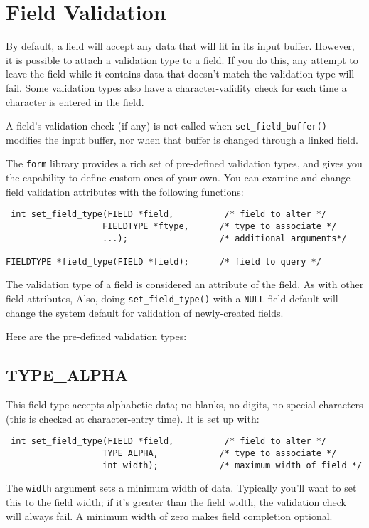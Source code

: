 \section{Field Validation}

\label{f0:fvalidation}By default, a field will accept any data that will fit in its input buffer.
However, it is possible to attach a validation type to a field.  If you do
this, any attempt to leave the field while it contains data that doesn't
match the validation type will fail.  Some validation types also have a
character-validity check for each time a character is entered in the field. 

A field's validation check (if any) is not called when
\texttt{set\_field\_buffer()} modifies the input buffer, nor when that buffer
is changed through a linked field. 

The \texttt{form} library provides a rich set of pre-defined validation
types, and gives you the capability to define custom ones of your own.  You
can examine and change field validation attributes with the following
functions:
\begin{verbatim} int set_field_type(FIELD *field,          /* field to alter */
                   FIELDTYPE *ftype,      /* type to associate */
                   ...);                  /* additional arguments*/

FIELDTYPE *field_type(FIELD *field);      /* field to query */
\end{verbatim}
The validation type of a field is considered an attribute of the field.  As
with other field attributes, Also, doing \texttt{set\_field\_type()} with a
\texttt{NULL} field default will change the system default for validation of
newly-created fields. 

Here are the pre-defined validation types:

\subsection{TYPE\_ALPHA}

\label{f0:ftype.alpha}This field type accepts alphabetic data; no blanks, no digits, no special
characters (this is checked at character-entry time).  It is set up with:
\begin{verbatim} int set_field_type(FIELD *field,          /* field to alter */
                   TYPE_ALPHA,            /* type to associate */
                   int width);            /* maximum width of field */
\end{verbatim}
The \texttt{width} argument sets a minimum width of data.  Typically
you'll want to set this to the field width; if it's greater than the
field width, the validation check will always fail.  A minimum width
of zero makes field completion optional.

